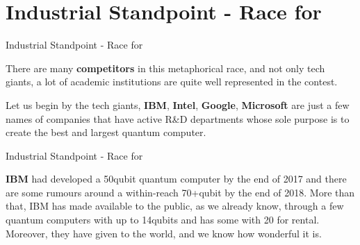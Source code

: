 \documentclass[aspectratio=43]{beamer}
\begin{document}
\section{Industrial Standpoint - Race for \q}
\begin{frame}{Industrial Standpoint - Race for \q}
    \begin{card}
        There are many \textbf{competitors} in this metaphorical race, and not only tech giants, a lot of academic institutions are quite well represented in the contest.
    \end{card}
    \begin{card}
        Let us begin by the tech giants, \textbf{IBM}, \textbf{Intel}, \textbf{Google}, \textbf{Microsoft} are just a few names of companies that have active R\&D departments whose sole purpose is to create the best and largest quantum computer. 
    \end{card}
\pagenumber
\end{frame}

\begin{frame}{Industrial Standpoint - Race for \q}
    \begin{card}
        \textbf{IBM} had developed a 50qubit quantum computer by the end of 2017 and there are some rumours around a within-reach 70+qubit by the end of 2018. More than that, IBM has made available to the public, as we already know, through \href{https://quantumexperience.ng.bluemix.net/qx}{\imqe} a few quantum computers with up to 14qubits and has some with 20 for rental.\\
        Moreover, they have given \href{https://qiskit.org/}{\qk} to the world, and we know how wonderful it is.
    \end{card}
\pagenumber
\end{frame}
\end{document}
